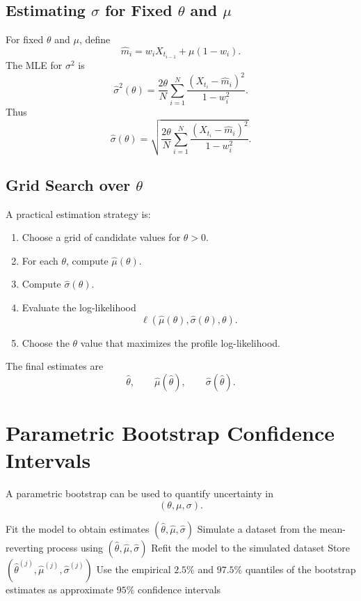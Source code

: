 \documentclass[12pt,oneside]{book}
\numberwithin{equation}{section}
\theoremstyle{definition}
\theoremstyle{plain}
\theoremstyle{remark}
\begin{document}
\subsection{Estimating $\sigma$ for Fixed $\theta$ and $\mu$}

For fixed $\theta$ and $\mu$, define
\[
\hat{m}_i
=
w_iX_{t_{i-1}}+\mu(1-w_i).
\]
The MLE for $\sigma^2$ is
\[
\hat{\sigma}^2(\theta)
=
\frac{2\theta}{N}
\sum_{i=1}^N
\frac{(X_{t_i}-\hat{m}_i)^2}{1-w_i^2}.
\]
Thus
\[
\hat{\sigma}(\theta)
=
\sqrt{
\frac{2\theta}{N}
\sum_{i=1}^N
\frac{(X_{t_i}-\hat{m}_i)^2}{1-w_i^2}
}.
\]

\subsection{Grid Search over $\theta$}

A practical estimation strategy is:
\begin{enumerate}
\item Choose a grid of candidate values for $\theta>0$.
\item For each $\theta$, compute $\hat{\mu}(\theta)$.
\item Compute $\hat{\sigma}(\theta)$.
\item Evaluate the log-likelihood
\[
\ell(\hat{\mu}(\theta),\hat{\sigma}(\theta),\theta).
\]
\item Choose the $\theta$ value that maximizes the profile log-likelihood.
\end{enumerate}

The final estimates are
\[
\hat{\theta},
\qquad
\hat{\mu}(\hat{\theta}),
\qquad
\hat{\sigma}(\hat{\theta}).
\]

\section{Parametric Bootstrap Confidence Intervals}

A parametric bootstrap can be used to quantify uncertainty in
\[
(\theta,\mu,\sigma).
\]

\begin{algorithm}[H]
\caption{Parametric Bootstrap for Mean-Reverting Process}
\begin{algorithmic}[1]
\State Fit the model to obtain estimates $(\hat{\theta},\hat{\mu},\hat{\sigma})$
    \State Simulate a dataset from the mean-reverting process using $(\hat{\theta},\hat{\mu},\hat{\sigma})$
    \State Refit the model to the simulated dataset
    \State Store $(\hat{\theta}^{(j)},\hat{\mu}^{(j)},\hat{\sigma}^{(j)})$
\EndFor
\State Use the empirical $2.5\%$ and $97.5\%$ quantiles of the bootstrap estimates as approximate $95\%$ confidence intervals
\end{algorithmic}
\end{algorithm}
\end{document}
